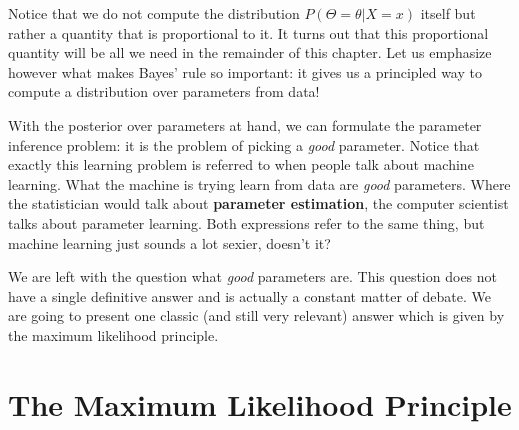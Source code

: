Notice that we do not compute the distribution $ P(\Theta = \theta|X =x) $ itself but rather a quantity that is proportional to it. It turns out that this proportional quantity will be all
we need in the remainder of this chapter. Let us emphasize however what makes Bayes' rule so important: it gives us a principled way to compute a
distribution over parameters from data!

With the posterior over parameters at hand, we can formulate the parameter inference problem: it is the problem of picking
a \emph{good} parameter. Notice that exactly this learning problem is referred to when people talk about machine learning. What the machine is trying learn from data are \emph{good} parameters. Where the statistician would talk about
\textbf{parameter estimation}, the computer scientist talks about parameter learning. Both expressions refer to the same thing, but machine learning just sounds a lot
sexier, doesn't it?

We are left with the question what \emph{good} parameters are. This question does not have a single definitive answer and is actually a constant matter of debate. We
are going to present one classic (and still very relevant) answer which is given by the maximum likelihood principle.


\section{The Maximum Likelihood Principle}

